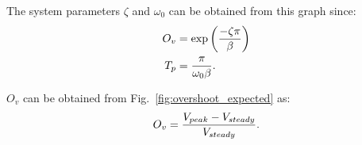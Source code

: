 The system parameters $\zeta$ and $\omega_0$ can be obtained from this graph since:
\begin{align}
	O_v &= \exp \left( { -\zeta\pi \over \beta } \right) \label{eqn:overshoot} \\
	T_p &= { \pi \over \omega_0\beta }. \label{eqn:period}
\end{align}

$O_v$ can be obtained from Fig.~\ref{fig:overshoot_expected} as:
\begin{equation*}
	O_v = {V_{peak} - V_{steady} \over V_{steady}}.
\end{equation*}
